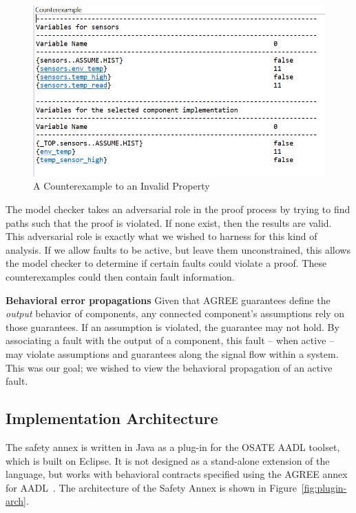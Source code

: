 \begin{figure}[h!]
	\begin{center}
	\includegraphics[width=1.0\textwidth]{images/coex.png}
	\caption{A Counterexample to an Invalid Property}
	\label{fig:coex}
	\end{center}
\end{figure}

The model checker takes an adversarial role in the proof process by trying to find paths such that the proof is violated. If none exist, then the results are valid. This adversarial role is exactly what we wished to harness for this kind of analysis. If we allow faults to be active, but leave them unconstrained, this allows the model checker to determine if certain faults could violate a proof. These counterexamples could then contain fault information. 

\textbf{Behavioral error propagations} Given that AGREE guarantees define the {\em output} behavior of components, any connected component's assumptions rely on those guarantees. If an assumption is violated, the guarantee may not hold. By associating a fault with the output of a component, this fault -- when active -- may violate assumptions and guarantees along the signal flow within a system. This was our goal; we wished to view the behavioral propagation of an active fault. 

\subsection{Implementation Architecture}
\label{sec:implArchitecture}
The safety annex is written in Java as a plug-in for the OSATE AADL toolset, which is built on Eclipse.  It is not designed as a stand-alone extension of the language, but works with behavioral contracts specified using the AGREE annex for AADL~\cite{NFM2012:CoGaMiWhLaLu}. 
The architecture of the Safety Annex is shown in Figure~\ref{fig:plugin-arch}.

